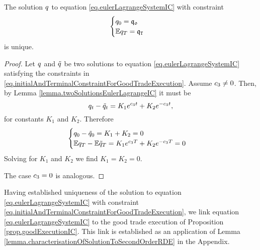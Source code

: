 \documentclass[10pt,a4paper]{article}
\begin{document}
\begin{lemma}
\label{lemma.uniquenessOfEulerLagrangeIC}
The solution $q$ to equation \eqref{eq.eulerLagrangeSystemIC} with constraint
\begin{equation}\label{eq.initialAndTerminalConstraintForGoodTradeExecution}
\begin{cases}
q_0 = \mathfrak{q_0} \\
\mathbb{{E}} q_T = \mathfrak{q}_{\mathtt{T} } 
\end{cases}
\end{equation}
is unique. 
\end{lemma}
\begin{proof}
Let  $q$ and $\tilde{q}$ be two solutions to equation \eqref{eq.eulerLagrangeSystemIC} satisfying the constraints in \eqref{eq.initialAndTerminalConstraintForGoodTradeExecution}. Assume $c_{3} \neq 0$. Then, by Lemma \ref{lemma.twoSolutionsEulerLagrangeIC} it must be
\begin{equation*}
q_t - \tilde{q}_t = K_1 e^{c_{3} t } + K_2 e^{-c_{3} t},
\end{equation*}
for constants $K_1$ and $K_2$. Therefore 
\begin{equation*}
\begin{cases}
q_0 - \tilde{q}_0 = K_1 + K_2 =0 \\
\mathbb{{E}} q_T  - \mathbb{{E}} \tilde{q}_T =
 K_1 e^{c_{3}T } + K_2 e^{-c_{3}T } =0
\end{cases}
\end{equation*}
Solving for  $K_1$ and $K_2$ we find $K_1=K_2=0$. 

The case  $c_{3} = 0$ is analogous. 
\end{proof}
Having established uniqueness of the solution to   equation \eqref{eq.eulerLagrangeSystemIC} with constraint \eqref{eq.initialAndTerminalConstraintForGoodTradeExecution}, we link equation \eqref{eq.eulerLagrangeSystemIC} to the good trade execution of Proposition \ref{prop.goodExecutionIC}. This link is established as an application of Lemma \ref{lemma.characterisationOfSolutionToSecondOrderRDE} in the Appendix. 
\end{document}
